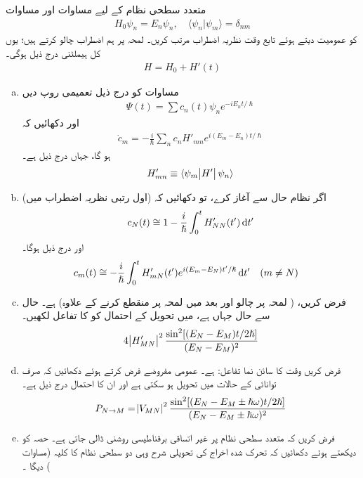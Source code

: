 متعدد سطحی نظام کے لیے مساوات  اور مساوات 
\begin{align}
	H_0\psi_n = E_n\psi_n,\quad  \langle \psi_n|\psi_m \rangle = \delta_{nm}
\end{align}
کو عمومیت دیتے ہوئے تابع وقت نظریہ اضطراب  مرتب کریں۔ لمحہ  پر ہم  اضطراب  چالو کرتے ہیں؛  یوں کل ہیملٹنی درج ذیل ہوگی۔
\begin{align}
	H = H_0 + H'(t)
\end{align}
\begin{enumerate}[a.]
\item
 مساوات   کو درج ذیل تعمیمی  روپ دیں
\begin{align}
	\Psi(t) = \sum c_n(t)\psi_ne^{-iE_nt/\hslash}
\end{align}
اور دکھائیں کہ
\begin{align}
	\dot{c}_m = -\frac{i}{\hslash}\sum_{n} c_nH'_{mn}e^{i(E_m-E_n)t/\hslash}
\end{align}
ہو گا، جہاں  درج ذیل ہے۔
\begin{align}
	H'_{mn} \equiv \langle \psi_m\abs{H'}\psi_n \rangle
\end{align}
\item
اگر نظام حال   سے  آغاز کرے،  تو دکھائیں کہ   (اول رتبی  نظریہ اضطراب میں)  
\begin{align}
	c_N(t)\cong1-\frac{i}{\hslash}\int_{0}^{t}H'_{NN}(t')\dif t'
\end{align}
اور درج ذیل ہوگا۔
\begin{align}
	c_m(t)&\cong-\frac{i}{\hslash}\int_{0}^{t}H'_{mN}(t')e^{i(E_m-E_N)t'/\hslash}\dif t'&& (m\neq N)
\end{align}
\item
 فرض کریں،  ( لمحہ  پر چالو اور بعد میں لمحہ  پر منقطع کرنے کے علاوہ)     ہے۔ حال  سے حال   جہاں   ہے، میں تحویل کے احتمال کو  کا تفاعل لکھیں۔
\begin{align}
	4\abs{H'_{MN}}^2\frac{\sin^2[(E_N-E_M)t/2\hslash]}{(E_N-E_M)^2}
\end{align}
\item
 فرض کریں  وقت کا سائن نما تفاعل:   ہے۔ عمومی مفروضے فرض کرتے ہوئے دکھائیں کہ صرف توانائی  کے حالات میں تحویل ہو سکتی ہے اور ان کا احتمال درج ذیل ہے۔
\begin{align}
	P_{N\to M} = \abs{V_{MN}}^2\frac{\sin^2[(E_N-E_M\pm\hslash\omega)t/2\hslash]}{(E_N-E_M\pm\hslash\omega)^2}
\end{align}
\item
 فرض کریں کہ  متعدد سطحی نظام پر غیر اتساقی برقناطیسی روشنی ڈالی جاتی ہے۔ حصہ    کو دیکھتے ہوئے دکھائیں کہ تحرک شدہ اخراج کی تحویلی شرح وہی  دو سطحی نظام کا   کلیہ  (مساوات )   دیگا ۔
 \end{enumerate}
